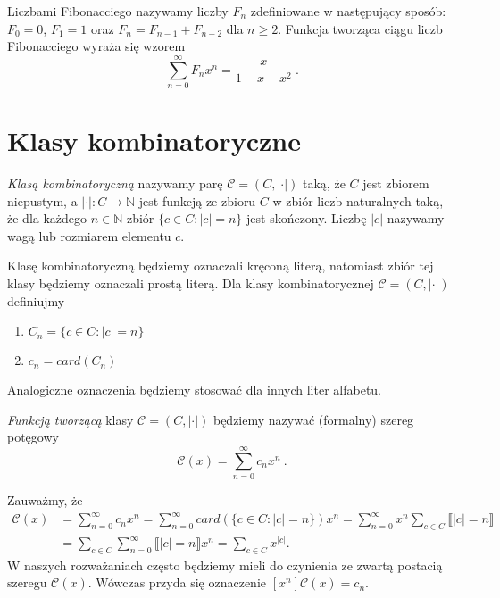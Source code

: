 Liczbami Fibonacciego nazywamy liczby $F_n$ zdefiniowane w następujący sposób: $F_0=0$, $F_1=1$ oraz $F_n = F_{n-1}+F_{n-2}$ dla $n\geq 2$. Funkcja tworząca ciągu liczb Fibonacciego wyraża się wzorem
\begin{equation} \label{eq:Fib}
\sum\limits_{n=0}^{\infty} F_n x^n = \frac{x}{1-x-x^2}~.
\end{equation}

\section{Klasy kombinatoryczne}

\begin{definition}
    \emph{Klasą kombinatoryczną} nazywamy parę $\mathcal{C}=(C,|\cdot|)$ taką, że $C$ jest zbiorem niepustym, a $|\cdot|:C \to \mathbb{N}$ jest funkcją ze zbioru $C$ w zbiór liczb naturalnych taką, że dla każdego $n\in \mathbb{N}$ zbiór $\{c\in C: |c|=n\}$ jest skończony. Liczbę $|c|$ nazywamy wagą lub rozmiarem elementu $c$.
\end{definition}

Klasę kombinatoryczną będziemy oznaczali kręconą literą, natomiast zbiór tej klasy będziemy oznaczali prostą literą. Dla klasy kombinatorycznej $\mathcal{C} = (C,|\cdot|)$  definiujmy
\begin{enumerate}
    \item $C_n = \{c\in C: |c|=n\}$
    \item $c_n = card(C_n)$
\end{enumerate}
Analogiczne oznaczenia będziemy stosować dla innych liter alfabetu.

\begin{definition}
    \emph{Funkcją tworzącą} klasy $\mathcal{C}=(C,|\cdot|)$ będziemy nazywać (formalny) szereg potęgowy
    $$\mathcal{C}(x) = \sum_{n=0}^{\infty}{c_nx^n}~.$$
\end{definition}

Zauważmy, że
\begin{equation*}
    \begin{aligned}
        \mathcal{C}(x) &= \sum_{n=0}^{\infty}{c_nx^n} = \sum_{n=0}^{\infty}{card(\{c\in C: |c|=n\})x^n} = \sum_{n=0}^{\infty}{x^n\sum_{c\in C}{\llbracket |c| = n \rrbracket}}\\
        &= \sum_{c\in C}{\sum_{n=0}^{\infty}{\llbracket |c| = n \rrbracket x^n}} = \sum_{c\in C}{x^{|c|}}.
    \end{aligned}
\end{equation*}
W naszych rozważaniach często będziemy mieli do czynienia ze zwartą postacią szeregu $\mathcal{C}(x)$. Wówczas przyda się oznaczenie $[x^n]\mathcal{C}(x)=c_n$.


